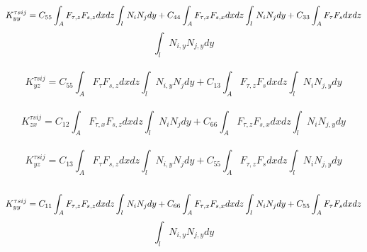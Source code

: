 \documentclass[a4paper,12pt]{article}
\begin{document}
\\
$$ K_{yy}^{\tau s i j} = C_{55} \int_{A}^{} F_{\tau,z} F_{s,z} dx dz \int_{l}^{} N_{i} N_{j} dy + C_{44} \int_{A}^{} F_{\tau,x} F_{s,x} dx dz \int_{l}^{} N_{i} N_{j} dy + C_{33} \int_{A}^{} F_{\tau} F_{s} dx dz\\$$ $$\int_{l}^{} N_{i,y} N_{j,y} dy $$\\
$$ K_{yz}^{\tau s i j} = C_{55} \int_{A}^{} F_{\tau} F_{s,z} dx dz \int_{l}^{} N_{i,y} N_{j} dy + C_{13} \int_{A}^{} F_{\tau,z} F_{s} dx dz \int_{l}^{} N_{i} N_{j,y} dy$$\\
$$ K_{zx}^{\tau s i j} = C_{12} \int_{A}^{} F_{\tau,x} F_{s,z} dx dz \int_{l}^{} N_{i} N_{j} dy + C_{66} \int_{A}^{} F_{\tau,z} F_{s,x} dx dz \int_{l}^{} N_{i} N_{j,y} dy$$\\
$$ K_{yz}^{\tau s i j} = C_{13} \int_{A}^{} F_{\tau} F_{s,z} dx dz \int_{l}^{} N_{i,y} N_{j} dy + C_{55} \int_{A}^{} F_{\tau,z} F_{s} dx dz \int_{l}^{} N_{i} N_{j,y} dy$$\\
$$ K_{yy}^{\tau s i j} = C_{11} \int_{A}^{} F_{\tau,z} F_{s,z} dx dz \int_{l}^{} N_{i} N_{j} dy + C_{66} \int_{A}^{} F_{\tau,x} F_{s,x} dx dz \int_{l}^{} N_{i} N_{j} dy + C_{55} \int_{A}^{} F_{\tau} F_{s} dx dz\\$$ $$\int_{l}^{} N_{i,y} N_{j,y} dy $$\\
\end{document}
